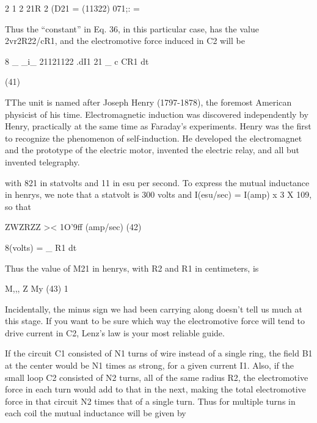 \begin{equation}
\end{equation}
2 1 2 21R 2
(D21 = (11322) 071;: = %

Thus the ``constant'' in Eq. 36, in this particular case, has the value
2vr2R22/cR1, and the electromotive force induced in C2 will be

\begin{equation}
\end{equation}
8 _ _i_ 21121122 .dI1
21 _ c CR1 dt

(41)

TThe unit is named after Joseph Henry (1797-1878), the foremost American physicist
of his time. Electromagnetic induction was discovered independently by Henry, practically
at the same time as Faraday's experiments. Henry was the first to recognize the
phenomenon of self-induction. He developed the electromagnet and the prototype of
the electric motor, invented the electric relay, and all but invented telegraphy.

 

with 821 in statvolts and 11 in esu per second. To express the mutual
inductance in henrys, we note that a statvolt is 300 volts and
I(esu/sec) = I(amp) x 3 X 109, so that

\begin{equation}
\end{equation}
ZWZRZZ >< 1O'9ff (amp/sec) (42)

8(volts) = _ R1 dt

Thus the value of M21 in henrys, with R2 and R1 in centimeters, is

\begin{equation}
\end{equation}
M,,, Z My (43)
1

Incidentally, the minus sign we had been carrying along doesn't tell
us much at this stage. If you want to be sure which way the electromotive
force will tend to drive current in C2, Lenz's law is your most
reliable guide.

If the circuit C1 consisted of N1 turns of wire instead of a single
ring, the field B1 at the center would be N1 times as strong, for a given
current I1. Also, if the small loop C2 consisted of N2 turns, all of the
same radius R2, the electromotive force in each turn would add to
that in the next, making the total electromotive force in that circuit
N2 times that of a single turn. Thus for multiple turns in each coil
the mutual inductance will be given by

